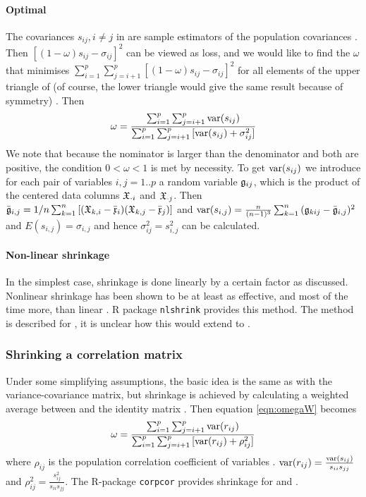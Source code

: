 \paragraph{Optimal \skalar{\omega}}
The covariances \(s_{ij}, i \neq j \) in  are sample estimators of the population covariances . Then \([(1-\omega) s_{ij} - \sigma_{ij}]^2 \) can be viewed as loss, and we would like to find the \(\omega \) that minimises \(\sum_{i=1}^p{\sum_{j=i+1}^{p}{[(1-\omega) s_{ij} - \sigma_{ij}]^2}} \) for all elements of the upper triangle of  (of course, the lower triangle would give the same result because of symmetry) \parencite{Kwa-11}. Then
\begin{equation} \label{eqn:omegaW}
  \omega = \frac{\sum_{i=1}^p{\sum_{j=i+1}^{p}{\operatorname{var}(s_{ij})}}}{\sum_{i=1}^p{\sum_{j=i+1}^{p}{[\operatorname{var}(s_{ij}) + \sigma_{ij}^2]}}}
\end{equation}
We note that because the nominator is larger than the denominator and both are positive, the condition \(0 < \omega < 1 \) is met by necessity. To get \(\operatorname{var}(s_{ij}) \) we introduce for each pair of variables \(i,j = 1..p \)  a random variable \(\mathfrak{g}_{ij} \), which is the product of the centered data columns \(\mathfrak{X}_{\cdot{i}} \) and \(\mathfrak{X}_{\cdot{j}} \). Then \(\bar{\mathfrak{g}}_{i,j} = 1/n \sum_{k=1}^{n}{[(\mathfrak{X}_{k,i} - \bar{\mathfrak{x}}_i) (\mathfrak{X}_{k,j} - \bar{\mathfrak{x}}_j)]} \) and \(\operatorname{var}(s_{i,j}) = \frac{n}{(n-1)^3} \sum_{k=1}^n{(\mathfrak{g}_{kij} - \bar{\mathfrak{g}}_{i,j})^2} \) and \(E(s_{i,j}) = \sigma_{i,j} \) and hence \(\sigma_{ij}^2 = s_{i,j}^2 \) \skalar{\omega} can be calculated.

\paragraph{Non-linear shrinkage}
In the simplest case, shrinkage is done linearly by a certain factor \skalar{\omega} as discussed.  Nonlinear shrinkage has been shown to be at least as effective, and most of the time more, than linear \parencite{Led-17}. R package \texttt{nlshrink} provides this method. The method is described for , it is unclear how this would extend to .

\subsubsection{Shrinking a correlation matrix }

Under some simplifying assumptions, the basic idea is the same as with the variance-covariance matrix, but shrinkage is achieved by calculating a weighted average between  and the identity matrix  \parencite{Scha-05,Kwa-11}. Then equation \ref{eqn:omegaW} becomes
\begin{equation} \label{eqn:omegaR}
  \omega = \frac{\sum_{i=1}^p{\sum_{j=i+1}^{p}{\operatorname{var}(r_{ij})}}}{\sum_{i=1}^p{\sum_{j=i+1}^{p}{[\operatorname{var}(r_{ij}) + \rho_{ij}^2]}}}
\end{equation}
where \(\rho_{ij} \) is the population correlation coefficient of variables . \(\operatorname{var}(r_{ij}) = \frac{\operatorname{var}(s_{ij})}{s_{ii} s_{jj}} \) and \(\rho_{ij}^2 = \frac{s_{ij}^2}{s_{ii} s_{jj}} \). The R-package \texttt{corpcor} provides shrinkage for  and .

